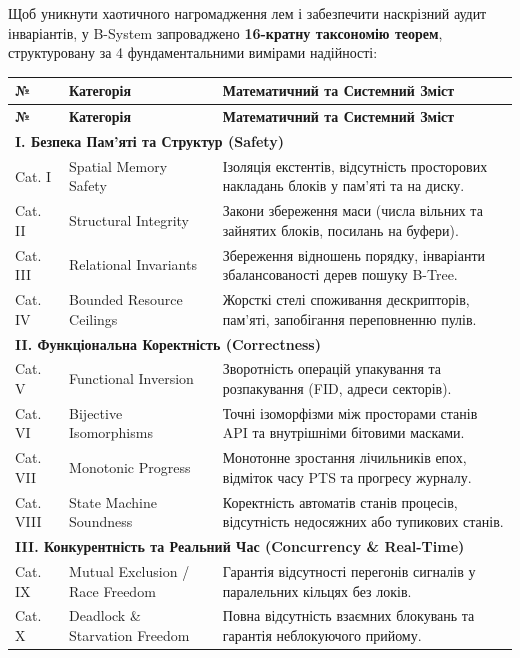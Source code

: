 \documentclass{article}
\begin{document}
Щоб уникнути хаотичного нагромадження лем і забезпечити наскрізний аудит інваріантів, у B-System запроваджено \textbf{16-кратну таксономію теорем}, структуровану за 4 фундаментальними вимірами надійності:

\begin{center}
\begin{longtable}{@{}lp{5.2cm}p{6.5cm}@{}}
\toprule
\textbf{№} & \textbf{Категорія} & \textbf{Математичний та Системний Зміст} \\
\midrule
\endfirsthead
\toprule
\textbf{№} & \textbf{Категорія} & \textbf{Математичний та Системний Зміст} \\
\midrule
\endhead
\multicolumn{3}{l}{\textbf{\color{nato}I. Безпека Пам'яті та Структур (Safety)}}\\[2pt]
Cat. I & Spatial Memory Safety & Ізоляція екстентів, відсутність просторових накладань блоків у пам'яті та на диску. \\
Cat. II & Structural Integrity & Закони збереження маси (числа вільних та зайнятих блоків, посилань на буфери). \\
Cat. III & Relational Invariants & Збереження відношень порядку, інваріанти збалансованості дерев пошуку B-Tree. \\
Cat. IV & Bounded Resource Ceilings & Жорсткі стелі споживання дескрипторів, пам'яті, запобігання переповненню пулів. \\[4pt]
\multicolumn{3}{l}{\textbf{\color{nato}II. Функціональна Коректність (Correctness)}}\\[2pt]
Cat. V & Functional Inversion & Зворотність операцій упакування та розпакування (FID, адреси секторів). \\
Cat. VI & Bijective Isomorphisms & Точні ізоморфізми між просторами станів API та внутрішніми бітовими масками. \\
Cat. VII & Monotonic Progress & Монотонне зростання лічильників епох, відміток часу PTS та прогресу журналу. \\
Cat. VIII & State Machine Soundness & Коректність автоматів станів процесів, відсутність недосяжних або тупикових станів. \\[4pt]
\multicolumn{3}{l}{\textbf{\color{nato}III. Конкурентність та Реальний Час (Concurrency \& Real-Time)}}\\[2pt]
Cat. IX & Mutual Exclusion / Race Freedom & Гарантія відсутності перегонів сигналів у паралельних кільцях без локів. \\
Cat. X & Deadlock \& Starvation Freedom & Повна відсутність взаємних блокувань та гарантія неблокуючого прийому. \\

\end{longtable}
\end{center}
\end{document}
